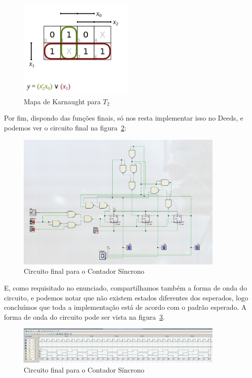 \documentclass[12pt]{article}
\begin{document}
\begin{figure}[H]
  \centering
  \includegraphics[width=0.5\textwidth]{Exp09/images/Q2.png}
  \caption{Mapa de Karnaught para $T_{2}$}\label{fig:Q2.png}
\end{figure}

Por fim, dispondo das funções finais, só nos resta implementar isso no Deeds, e
podemos ver o circuito final na figura~\ref{fig:2.1.4_circuit.png}:

\begin{figure}[H]
  \centering
  \includegraphics[width=0.9\textwidth]{Exp09/images/2.1.4_circuit.png}
  \caption{Circuito final para o Contador Síncrono}\label{fig:2.1.4_circuit.png}
\end{figure}

E, como requisitado no enunciado, compartilhamos também a forma de onda do
circuito, e podemos notar que não existem estados diferentes dos esperados, logo
concluímos que toda a implementação está de acordo com o padrão esperado. A
forma de onda do circuito pode ser vista na figura~\ref{fig:2.1.4.wave.png}.

\begin{figure}[H]
  \centering
  \includegraphics[width=0.9\textwidth]{Exp09/images/2.1.4.wave.png}
  \caption{Circuito final para o Contador Síncrono}\label{fig:2.1.4.wave.png}
\end{figure}
\end{document}
